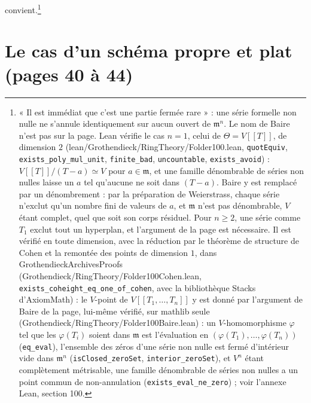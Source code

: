 \documentclass[11pt,a4paper]{article}
\begin{document}
convient.\footnote{« Il est immédiat que c'est une partie fermée rare » :
une série formelle non nulle ne s'annule identiquement sur aucun ouvert de
$\mathfrak{m}^n$. Le nom de Baire n'est pas sur la page. Lean vérifie le cas
$n = 1$, celui de $\Theta = V[[T]]$, de dimension $2$
(lean/Grothendieck/RingTheory/Folder100.lean, \texttt{quotEquiv},
\texttt{exists\_poly\_mul\_unit}, \texttt{finite\_bad},
\texttt{uncountable}, \texttt{exists\_avoid}) : $V[[T]]/(T - a) \simeq V$
pour $a \in \mathfrak{m}$, et une famille dénombrable de séries non nulles
laisse un $a$ tel qu'aucune ne soit dans $(T - a)$. Baire y est remplacé par
un dénombrement : par la préparation de Weierstrass, chaque série n'exclut
qu'un nombre fini de valeurs de $a$, et $\mathfrak{m}$ n'est pas dénombrable,
$V$ étant complet, quel que soit son corps résiduel. Pour $n \geqslant 2$,
une série comme $T_1$ exclut tout un hyperplan, et l'argument de la page est
nécessaire. Il est vérifié en toute dimension, avec la réduction par le
théorème de structure de Cohen et la remontée des points de dimension $1$,
dans GrothendieckArchivesProofs (Grothendieck/RingTheory/Folder100Cohen.lean,
\texttt{exists\_coheight\_eq\_one\_of\_cohen}, avec la bibliothèque Stacks d'AxiomMath) : le
$V$-point de $V[[T_1, \ldots, T_n]]$ y est donné par l'argument de Baire de la
page, lui-même vérifié, sur mathlib seule (Grothendieck/RingTheory/Folder100Baire.lean) : un
$V$-homomorphisme $\varphi$ tel que les $\varphi(T_i)$ soient dans $\mathfrak{m}$
est l'évaluation en $(\varphi(T_1), \ldots, \varphi(T_n))$ (\texttt{eq\_eval}),
l'ensemble des zéros d'une série non nulle est fermé d'intérieur vide dans
$\mathfrak{m}^n$ (\texttt{isClosed\_zeroSet}, \texttt{interior\_zeroSet}), et
$V^n$ étant complètement métrisable, une famille dénombrable de séries non nulles a
un point commun de non-annulation (\texttt{exists\_eval\_ne\_zero}) ; voir l'annexe
Lean, section 100.}

\section*{Le cas d'un schéma propre et plat (pages 40 à 44)}
\end{document}
